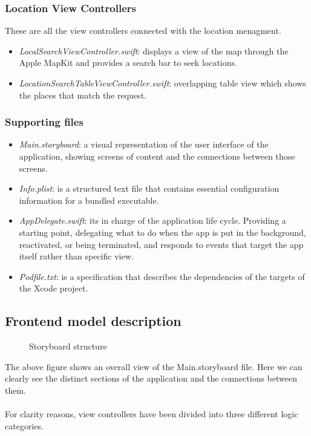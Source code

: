\subsubsection*{Location View Controllers}
These are all the view controllers connected with the location menagment.
\begin{itemize}
	\item \textit{LocalSearchViewController.swift}: displays a view of the map through the Apple MapKit and provides a search bar to seek locations.
	\item \textit{LocationSearchTableViewController.swift}: overlapping table view which shows the places that match the request.
\end{itemize}

\subsubsection*{Supporting files}
\begin{itemize}
	\item \textit{Main.storyboard}: a visual representation of the user interface of the application, showing screens of content and the connections between those screens.
	\item \textit{Info.plist}: is a structured text file that contains essential configuration information for a bundled executable.
	\item \textit{AppDelegate.swift}: its in charge of the application life cycle. Providing a starting point, delegating what to do when the app is put in the background, reactivated, or being terminated, and responds to events that target the app itself rather than specific view.
	\item \textit{Podfile.txt}: is a specification that describes the dependencies of the targets of the Xcode project.
\end{itemize}

\subsection{Frontend model description}
\begin{figure}[H]
	\centering
	\caption{Storyboard structure}
\end{figure}

The above figure shows an overall view of the Main.storyboard file. Here we can clearly see the distinct sections of the application and the connections between them.
\\ \\
For clarity reasons, view controllers have been divided into three different logic categories.


